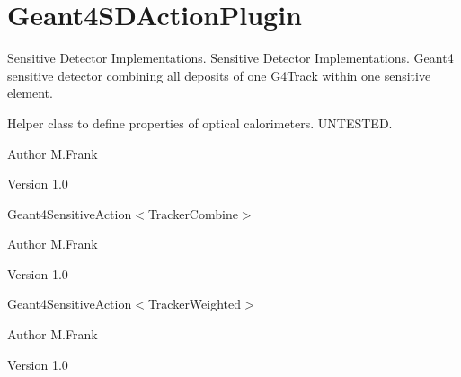 \hypertarget{group___geant4_s_d_action_plugin}{
\section{Geant4SDActionPlugin}
\label{group___geant4_s_d_action_plugin}
}


Sensitive Detector Implementations.  
Sensitive Detector Implementations. Geant4 sensitive detector combining all deposits of one G4Track within one sensitive element.

Helper class to define properties of optical calorimeters. UNTESTED.

\begin{DoxyAuthor}{Author}
M.Frank 
\end{DoxyAuthor}
\begin{DoxyVersion}{Version}
1.0
\end{DoxyVersion}
Geant4SensitiveAction$<$TrackerCombine$>$

\begin{DoxyAuthor}{Author}
M.Frank 
\end{DoxyAuthor}
\begin{DoxyVersion}{Version}
1.0
\end{DoxyVersion}
Geant4SensitiveAction$<$TrackerWeighted$>$

\begin{DoxyAuthor}{Author}
M.Frank 
\end{DoxyAuthor}
\begin{DoxyVersion}{Version}
1.0 
\end{DoxyVersion}
